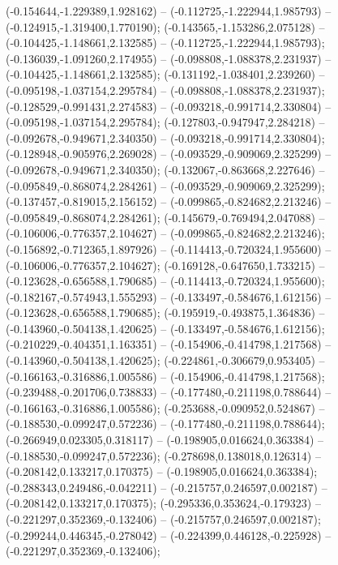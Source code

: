  (-0.154644,-1.229389,1.928162) -- (-0.112725,-1.222944,1.985793) -- (-0.124915,-1.319400,1.770190);
 (-0.143565,-1.153286,2.075128) -- (-0.104425,-1.148661,2.132585) -- (-0.112725,-1.222944,1.985793);
 (-0.136039,-1.091260,2.174955) -- (-0.098808,-1.088378,2.231937) -- (-0.104425,-1.148661,2.132585);
 (-0.131192,-1.038401,2.239260) -- (-0.095198,-1.037154,2.295784) -- (-0.098808,-1.088378,2.231937);
 (-0.128529,-0.991431,2.274583) -- (-0.093218,-0.991714,2.330804) -- (-0.095198,-1.037154,2.295784);
 (-0.127803,-0.947947,2.284218) -- (-0.092678,-0.949671,2.340350) -- (-0.093218,-0.991714,2.330804);
 (-0.128948,-0.905976,2.269028) -- (-0.093529,-0.909069,2.325299) -- (-0.092678,-0.949671,2.340350);
 (-0.132067,-0.863668,2.227646) -- (-0.095849,-0.868074,2.284261) -- (-0.093529,-0.909069,2.325299);
 (-0.137457,-0.819015,2.156152) -- (-0.099865,-0.824682,2.213246) -- (-0.095849,-0.868074,2.284261);
 (-0.145679,-0.769494,2.047088) -- (-0.106006,-0.776357,2.104627) -- (-0.099865,-0.824682,2.213246);
 (-0.156892,-0.712365,1.897926) -- (-0.114413,-0.720324,1.955600) -- (-0.106006,-0.776357,2.104627);
 (-0.169128,-0.647650,1.733215) -- (-0.123628,-0.656588,1.790685) -- (-0.114413,-0.720324,1.955600);
 (-0.182167,-0.574943,1.555293) -- (-0.133497,-0.584676,1.612156) -- (-0.123628,-0.656588,1.790685);
 (-0.195919,-0.493875,1.364836) -- (-0.143960,-0.504138,1.420625) -- (-0.133497,-0.584676,1.612156);
 (-0.210229,-0.404351,1.163351) -- (-0.154906,-0.414798,1.217568) -- (-0.143960,-0.504138,1.420625);
 (-0.224861,-0.306679,0.953405) -- (-0.166163,-0.316886,1.005586) -- (-0.154906,-0.414798,1.217568);
 (-0.239488,-0.201706,0.738833) -- (-0.177480,-0.211198,0.788644) -- (-0.166163,-0.316886,1.005586);
 (-0.253688,-0.090952,0.524867) -- (-0.188530,-0.099247,0.572236) -- (-0.177480,-0.211198,0.788644);
 (-0.266949,0.023305,0.318117) -- (-0.198905,0.016624,0.363384) -- (-0.188530,-0.099247,0.572236);
 (-0.278698,0.138018,0.126314) -- (-0.208142,0.133217,0.170375) -- (-0.198905,0.016624,0.363384);
 (-0.288343,0.249486,-0.042211) -- (-0.215757,0.246597,0.002187) -- (-0.208142,0.133217,0.170375);
 (-0.295336,0.353624,-0.179323) -- (-0.221297,0.352369,-0.132406) -- (-0.215757,0.246597,0.002187);
 (-0.299244,0.446345,-0.278042) -- (-0.224399,0.446128,-0.225928) -- (-0.221297,0.352369,-0.132406);
